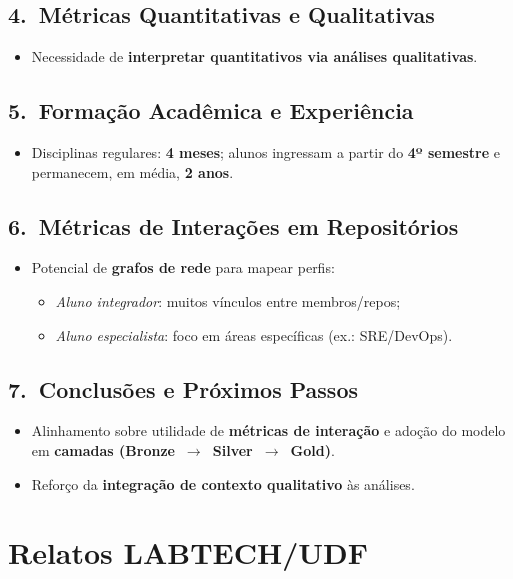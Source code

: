 \documentclass[
	12pt,
	openright,
	oneside,
	a4paper,
	brazil
]{abntex2}
\begin{document}
\begin{apendicesenv}
\section*{4.\ Métricas Quantitativas e Qualitativas}
\begin{itemize}
\item Necessidade de \textbf{interpretar quantitativos via análises qualitativas}.
\end{itemize}

\section*{5.\ Formação Acadêmica e Experiência}
\begin{itemize}
\item Disciplinas regulares: \textbf{4 meses}; alunos ingressam a partir do \textbf{4º semestre} e permanecem, em média, \textbf{2 anos}.
\end{itemize}

\section*{6.\ Métricas de Interações em Repositórios}
\begin{itemize}
\item Potencial de \textbf{grafos de rede} para mapear perfis:
\begin{itemize}
\item \textit{Aluno integrador}: muitos vínculos entre membros/repos;
\item \textit{Aluno especialista}: foco em áreas específicas (ex.: SRE/DevOps).
\end{itemize}
\end{itemize}

\section*{7.\ Conclusões e Próximos Passos}
\begin{itemize}
\item Alinhamento sobre utilidade de \textbf{métricas de interação} e adoção do modelo em \textbf{camadas (Bronze~$\rightarrow$~Silver~$\rightarrow$~Gold)}.
\item Reforço da \textbf{integração de contexto qualitativo} às análises.
\end{itemize}

\chapter{Relatos LABTECH/UDF}
\label{apendiceB}


\end{apendicesenv}
\end{document}
